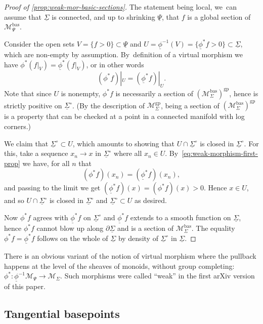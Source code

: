 \documentclass[10pt]{amsart}
\theoremstyle{definition}
\theoremstyle{remark}
\newenvironment{remark}
  {\pushQED{\qed}\renewcommand{\qedsymbol}{$\lozenge$}\remarkx}
  {\popQED\endremarkx}
\newcommand{\cM}{\mathscr{M}}
\newcommand{\cMgp}{\mathscr{M}^{\mathrm{gp}}}
\newcommand{\cMbas}{\mathscr{M}^{\mathrm{bas}}}
\newcommand{\Sig}{\Sigma}
\newcommand{\uSig}{\underline{\Sigma}}
\newcommand{\uSigo}{\underline{\Sigma}^\circ}
\newcommand{\uphi}{\underline{\phi}}
\newcommand{\uPsi}{\underline{\Psi}}
\begin{document}
\begin{proof}[Proof of \autoref{prop:weak-mor-basic-sections}]
The statement being local, we~can assume that $\uSig$ is connected, and up to shrinking $\uPsi$, that $f$ is a global section of $\cMbas_\Psi$.

Consider the open sets $V=\{f>0\} \subset \uPsi$ and $U=\uphi^{-1}(V)=\{\uphi^*f>0\} \subset \uSig$, which are non-empty by assumption. By~definition of a virtual morphism we have $\phi^*(f|_{V})=\uphi^*(f|_{V})$, or in other words
\begin{equation}\label{eq:weak-morphism-first-prop}
(\phi^*f)|_{U}=(\uphi^*f)|_{U}.
\end{equation}
Note that since $U$ is nonempty, $\phi^*f$ is necessarily a section of $(\cMbas_\Sig)^{\mathrm{gp}}$, hence is strictly positive on $\uSigo$. (By the description of $\cMgp_{\Sig}$, being a section of $(\cMbas_\Sig)^{\mathrm{gp}}$ is a property that can be checked at a point in a connected manifold with log corners.)

We claim that $\uSigo\subset U$, which amounts to showing that $U\cap \uSigo$ is closed in $\uSigo$. For this, take a sequence $x_n\to x$ in $\uSigo$ where all $x_n\in U$. By~\eqref{eq:weak-morphism-first-prop} we have, for all $n$ that
\[
(\phi^*f)(x_n)=(\uphi^*f)(x_n),
\]
and passing to the limit we get $(\uphi^*f)(x)=(\phi^*f)(x) > 0$. Hence $x\in U$, and so $U\cap\uSigo$ is closed in $\uSigo$ and $\uSigo\subset U$ as desired.

Now $\phi^*f$ agrees with $\uphi^*f$ on $\uSigo$ and $\uphi^*f$ extends to a smooth function on $\uSig$, hence $\phi^*f$ cannot blow up along $\partial\uSig$ and is a section of $\cMbas_\Sig$. The equality $\phi^*f=\uphi^*f$ follows on the whole of $\uSig$ by density of $\uSigo$ in $\uSig$.
\end{proof}

\begin{remark}\label{rem:virtual-vs-weak}
There is an obvious variant of the notion of virtual morphism where the pullback happens at the level of the sheaves of monoids, without group completing: $\phi^*:\uphi^{-1}\cM_{\Psi}\to \cM_\Sigma$. Such morphisms were called ``weak'' in the first arXiv version of this paper.
\end{remark}

\subsection{Tangential basepoints}\label{sec:tangential-basepoints}
\end{document}
